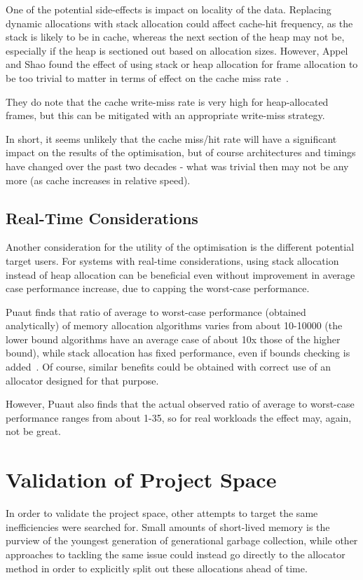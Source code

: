 One of the potential side-effects is impact on locality of the data. Replacing dynamic allocations with stack allocation could affect cache-hit frequency, as the stack is likely to be in cache, whereas the next section of the heap may not be, especially if the heap is sectioned out based on allocation sizes. However, Appel and Shao found the effect of using stack or heap allocation for frame allocation to be too trivial to matter in terms of effect on the cache miss rate~\cite{stackvheap}.

They do note that the cache write-miss rate is very high for heap-allocated frames, but this can be mitigated with an appropriate write-miss strategy.

In short, it seems unlikely that the cache miss/hit rate will have a significant impact on the results of the optimisation, but of course architectures and timings have changed over the past two decades - what was trivial then may not be any more (as cache increases in relative speed).

\subsection{Real-Time Considerations}

Another consideration for the utility of the optimisation is the different potential target users. For systems with real-time considerations, using stack allocation instead of heap allocation can be beneficial even without improvement in average case performance increase, due to capping the worst-case performance.

Puaut finds that ratio of average to worst-case performance (obtained analytically) of memory allocation algorithms varies from about 10-10000 (the lower bound algorithms have an average case of about 10x those of the higher bound), while stack allocation has fixed performance, even if bounds checking is added~\cite{mallocperf}. Of course, similar benefits could be obtained with correct use of an allocator designed for that purpose.

However, Puaut also finds that the actual observed ratio of average to worst-case performance ranges from about 1-35, so for real workloads the effect may, again, not be great.

\section{Validation of Project Space}

In order to validate the project space, other attempts to target the same inefficiencies were searched for. Small amounts of short-lived memory is the purview of the youngest generation of generational garbage collection, while other approaches to tackling the same issue could instead go directly to the allocator method in order to explicitly split out these allocations ahead of time.

